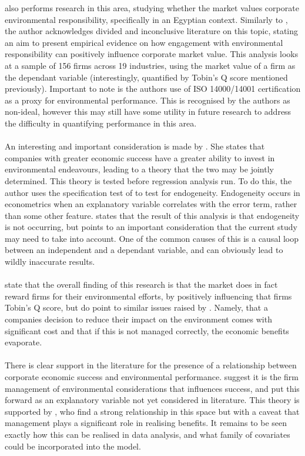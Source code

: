 {\cite{wahba2008does} also performs research in this area, studying whether the market values corporate environmental responsibility, specifically in an Egyptian context. Similarly to \cite{schaltegger2002link}, the author acknowledges divided and inconclusive literature on this topic, stating an aim to present empirical evidence on how engagement with environmental responsibility can positively influence corporate market value. This analysis looks at a sample of 156 firms across 19 industries, using the market value of a firm as the dependant variable (interestingly, quantified by Tobin's Q score mentioned previously). Important to note is the authors use of ISO 14000/14001 certification as a proxy for environmental performance. This is recognised by the authors as non-ideal, however this may still have some utility in future research to address the difficulty in quantifying performance in this area. \\\\
An interesting and important consideration is made by \cite{wahba2008does}. She states that companies with greater economic success have a greater ability to invest in environmental endeavours, leading to a theory that the two may be jointly determined. This theory is tested before regression analysis run. To do this, the author uses the specification test of \cite{hausman1978specification} to test for endogeneity. Endogeneity occurs in econometrics when an explanatory variable correlates with the error term, rather than some other feature. \cite{wahba2008does} states that the result of this analysis is that endogeneity is not occurring, but points to an important consideration that the current study may need to take into account. One of the common causes of this is a causal loop between an independent and a dependant variable, and can obviously lead to wildly inaccurate results. \\\\
 \cite{wahba2008does} state that the overall finding of this research is that the market does in fact reward firms for their environmental efforts, by positively influencing that firms Tobin's Q score, but do point to similar issues raised by \cite{schaltegger2002link}. Namely, that a companies decision to reduce their impact on the environment comes with significant cost and that if this is not managed correctly, the economic benefits evaporate.     \\\\
There is clear support in the literature for the presence of a relationship between corporate economic success and environmental performance. \cite{schaltegger2002link} suggest it is the firm management of environmental considerations that influences success, and put this forward as an explanatory variable not yet considered in literature. This theory is supported by \cite{wahba2008does}, who find a strong relationship in this space but with a caveat that management plays a significant role in realising benefits. It remains to be seen exactly how this can be realised in data analysis, and what family of covariates could be incorporated into the model.}
